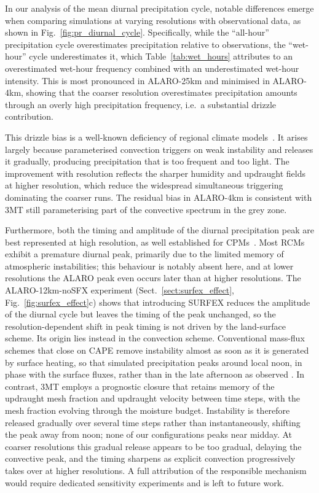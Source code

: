 \documentclass[journal abbreviation, manuscript]{copernicus}
\begin{document}
In our analysis of the mean diurnal precipitation cycle, notable differences emerge when comparing simulations at varying resolutions with observational data, as shown in Fig.~\ref{fig:pr_diurnal_cycle}. 
Specifically, while the ``all-hour'' precipitation cycle overestimates precipitation relative to observations, the ``wet-hour'' cycle underestimates it, which Table~\ref{tab:wet_hours} attributes to an overestimated wet-hour frequency combined with an underestimated wet-hour intensity. 
This is most pronounced in ALARO-25km and minimised in ALARO-4km, showing that the coarser resolution overestimates precipitation amounts through an overly high precipitation frequency, i.e.\ a substantial drizzle contribution.

This drizzle bias is a well-known deficiency of regional climate models~\citep{fosser_benefit_2015, berthou_pan-european_2020}. 
It arises largely because parameterised convection triggers on weak instability and releases it gradually, producing precipitation that is too frequent and too light. 
The improvement with resolution reflects the sharper humidity and updraught fields at higher resolution, which reduce the widespread simultaneous triggering dominating the coarser runs.
The residual bias in ALARO-4km is consistent with 3MT still parameterising part of the convective spectrum in the grey zone. 

Furthermore, both the timing and amplitude of the diurnal precipitation peak are best represented at high resolution, as well established for CPMs~\citep{lucas-picher_convection-permitting_2021}. 
Most RCMs exhibit a premature diurnal peak, primarily due to the limited memory of atmospheric instabilities; this behaviour is notably absent here, and at lower resolutions the ALARO peak even occurs later than at higher resolutions. 
The ALARO-12km-noSFX experiment (Sect.~\ref{sect:surfex_effect}, Fig.~\ref{fig:surfex_effect}c) shows that introducing SURFEX reduces the amplitude of the diurnal cycle but leaves the timing of the peak unchanged, so the resolution-dependent shift in peak timing is not driven by the land-surface scheme. 
Its origin lies instead in the convection scheme.
Conventional mass-flux schemes that close on CAPE remove instability almost as soon as it is generated by surface heating, so that simulated precipitation peaks around local noon, in phase with the surface fluxes, rather than in the late afternoon as observed \citep{guichardModellingDiurnalCycle2004,bechtoldSimulationDiurnalCycle2004}.
In contrast, 3MT employs a prognostic closure that retains memory of the updraught mesh fraction and updraught velocity between time steps, with the mesh fraction evolving through the moisture budget.
Instability is therefore released gradually over several time steps rather than instantaneously, shifting the peak away from noon; none of our configurations peaks near midday.
At coarser resolutions this gradual release appears to be too gradual, delaying the convective peak, and the timing sharpens as explicit convection progressively takes over at higher resolutions.
A full attribution of the responsible mechanism would require dedicated sensitivity experiments and is left to future work.
\end{document}
